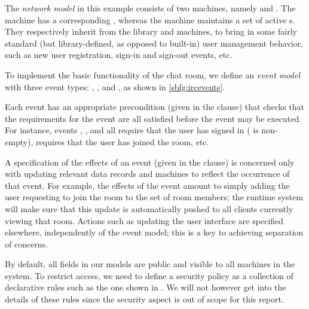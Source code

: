\documentclass[a4paper]{article}
\begin{document}
The \emph{network model} in this example consists of two machines, namely  and .  The  machine has a corresponding , whereas the  machine maintains a set of active s.  They respectively inherit from the library  and  machines, to bring in some fairly standard (but library-defined, as opposed to built-in) user management behavior, such as new user registration, sign-in and sign-out events, etc.

To implement the basic functionality of the chat room, we define an \emph{event model} with three event types: , , and , as shown in \ref{sbfg:ircevents}.

Each event has an appropriate precondition (given in the   clause) that checks that the requirements for the event are all satisfied before the event may be executed.  For instance,
events , , and  all require that the user has signed in ( is non-empty),  requires that the user has joined the room, etc.

A specification of the effects of an event (given in the  clause) is concerned only with updating relevant data records and machines to reflect the occurrence of that event. For example, the effects of the  event amount to simply adding the user requesting to join the room to the set of room members; the runtime system will make sure that this update is automatically pushed to all clients currently viewing that room. Actions such as updating
the user interface are specified elsewhere, independently of the event model; this is a key to achieving separation of concerns.

By default, all fields in our models are public and visible to all machines in the system. To restrict access, we need to define a security policy as a collection of declarative rules such as the one shown in . We will not however get into the details of these rules since the security aspect is out of scope for this report. 
\end{document}

